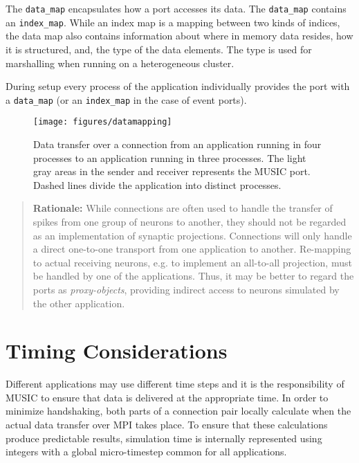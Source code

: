 \documentclass[a4paper]{report}
\newenvironment{rationale}%
{\par\begin{quote}\textbf{Rationale:}}%
{\par\end{quote}}
\begin{document}
The \lstinline|data_map| encapsulates how a port accesses its data.
The \lstinline|data_map| contains an \lstinline|index_map|.  While an
index map is a mapping between two kinds of indices, the data map also
contains information about where in memory data resides, how it is
structured, and, the type of the data elements.  The type is used for
marshalling when running on a heterogeneous cluster.

During setup every process of the application individually provides
the port with a \lstinline|data_map| (or an \lstinline|index_map| in
the case of event ports).

\begin{figure}
  \begin{center}
    \texttt{[image: figures/datamapping]}
    \caption[Mapping of data]{\label{fig:datamapping} Data transfer
      over a connection from an application running in four processes
      to an application running in three processes.  The light gray
      areas in the sender and receiver represents the MUSIC port.
      Dashed lines divide the application into distinct processes.  }
  \end{center}
\end{figure}

\begin{rationale}
  While connections are often used to handle the transfer of spikes
  from one group of neurons to another, they should not be regarded as
  an implementation of synaptic projections.
  Connections will only handle a direct one-to-one transport from one
  application to another.  Re-mapping to actual receiving neurons,
  e.g. to implement an all-to-all projection, must be handled by one
  of the applications.  Thus, it may be better to regard the ports as
  \emph{proxy-objects}, providing indirect access
  to neurons simulated by the other application.
\end{rationale}


\section{Timing Considerations}
\label{sec:timing}
  
Different applications may use different time steps and it is the
responsibility of MUSIC to ensure that data is delivered at the
appropriate time.  In order to minimize handshaking, both parts of a
connection pair locally calculate when the actual data transfer over
MPI takes place.  To ensure that these calculations produce
predictable results, simulation time is internally represented using
integers with a global micro-timestep common for
all applications.
\end{document}
